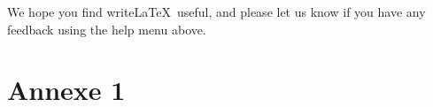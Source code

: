 We hope you find write\LaTeX\ useful, and please let us know if you have any feedback using the help menu above.

\appendix
\section{Annexe 1}
\label{sec:Annexe 1}



